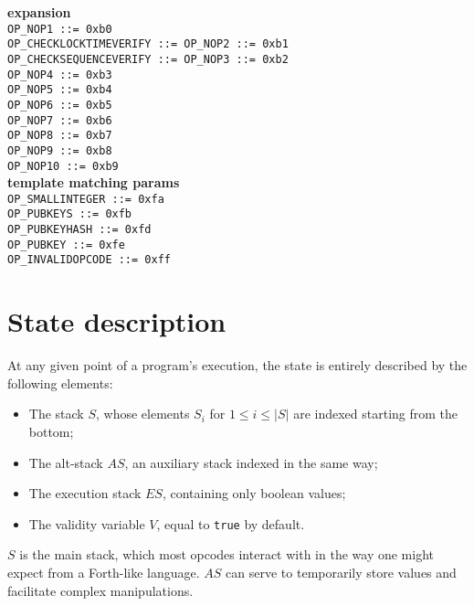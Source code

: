 \documentclass{article}
\begin{document}
\begin{multicols}{3}
\textbf{\centering expansion} \\
\texttt{OP\_NOP1 ::= 0xb0  } \\
\texttt{OP\_CHECKLOCKTIMEVERIFY ::= OP\_NOP2 ::= 0xb1  } \\
\texttt{OP\_CHECKSEQUENCEVERIFY ::= OP\_NOP3 ::= 0xb2  } \\
\texttt{OP\_NOP4 ::= 0xb3  } \\
\texttt{OP\_NOP5 ::= 0xb4  } \\
\texttt{OP\_NOP6 ::= 0xb5  } \\
\texttt{OP\_NOP7 ::= 0xb6  } \\
\texttt{OP\_NOP8 ::= 0xb7  } \\
\texttt{OP\_NOP9 ::= 0xb8  } \\
\texttt{OP\_NOP10 ::= 0xb9  } \\

\textbf{\centering template matching params }\\
\texttt{OP\_SMALLINTEGER ::= 0xfa  } \\
\texttt{OP\_PUBKEYS ::= 0xfb  } \\
\texttt{OP\_PUBKEYHASH ::= 0xfd  } \\
\texttt{OP\_PUBKEY ::= 0xfe  } \\
\texttt{OP\_INVALIDOPCODE ::= 0xff  } \\

\end{multicols}

\pagebreak[2]

\section{State description}

At any given point of a program's execution, the state is entirely described by the following elements:

\begin{itemize}
    \item The stack $S$, whose elements $S_i$ for $1 \leq i \leq |S|$ are indexed starting from the bottom;
    \item The alt-stack $AS$, an auxiliary stack indexed in the same way;
    \item The execution stack $ES$, containing only boolean values;
    \item The validity variable $V$, equal to \texttt{true} by default.
\end{itemize}

\noindent
$S$ is the main stack, which most opcodes interact with in the way one might expect from a Forth-like language. $AS$ can serve to temporarily store values and facilitate complex manipulations.\\ 
\end{document}
